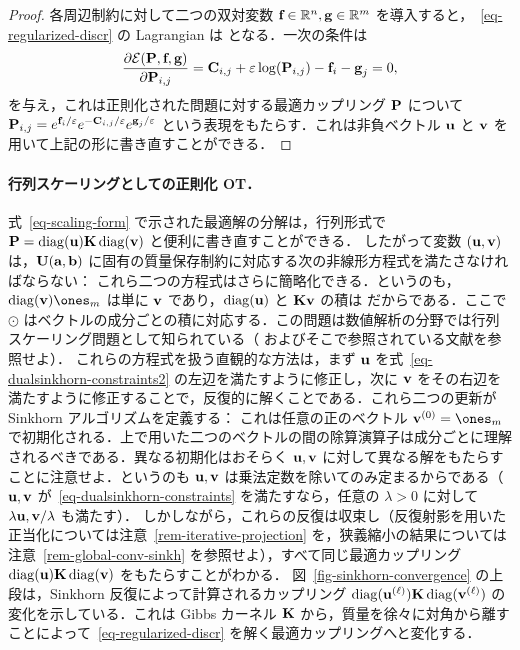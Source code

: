 \begin{proof}
各周辺制約に対して二つの双対変数 $\fD\in\RR^n,\gD\in\RR^m$ を導入すると，~\eqref{eq-regularized-discr} の Lagrangian は
となる．一次の条件は
$$
	\frac{\partial\Lag(\P,\fD,\gD)}{\partial \P_{i,j}}= \C_{i,j} + \varepsilon \log(\P_{i,j}) - \fD_i -\gD_j=0,
$$
を与え，これは正則化された問題に対する最適カップリング $\P$ について $\P_{i,j}=e^{\fD_i/\varepsilon}e^{-\C_{i,j}/\varepsilon}e^{\gD_j/\varepsilon}$ という表現をもたらす．これは非負ベクトル $\uD$ と $\vD$ を用いて上記の形に書き直すことができる．
\end{proof}

\paragraph{行列スケーリングとしての正則化 OT．}

式~\eqref{eq-scaling-form} で示された最適解の分解は，行列形式で $\P=\diag(\uD)\K\diag(\vD)$ と便利に書き直すことができる．
%
したがって変数 $(\uD,\vD)$ は，$\CouplingsD(\a,\b)$ に固有の質量保存制約に対応する次の非線形方程式を満たさなければならない：
これら二つの方程式はさらに簡略化できる．というのも，$\diag(\vD)\ones_m$ は単に $\vD$ であり，$\diag(\uD)$ と $\K \vD$ の積は
\eql{\label{eq-dualsinkhorn-constraints2}
	\uD \odot (\K \vD) = \a
	\qandq
	\vD \odot (\transp{\K}\uD) = \b,
}
だからである．ここで $\odot$ はベクトルの成分ごとの積に対応する．この問題は数値解析の分野では行列スケーリング問題として知られている（\citep{nemirovski1999complexity} およびそこで参照されている文献を参照せよ）．
%
これらの方程式を扱う直観的な方法は，まず $\uD$ を式~\eqref{eq-dualsinkhorn-constraints2} の左辺を満たすように修正し，次に $\vD$ をその右辺を満たすように修正することで，反復的に解くことである．これら二つの更新が Sinkhorn アルゴリズムを定義する：
\eql{\label{eq-sinkhorn}
	\itt{\uD} \eqdef \frac{\a}{\K \it{\vD}}
	\qandq
	\itt{\vD} \eqdef \frac{\b}{\transp{\K}\itt{\uD}},
}
これは任意の正のベクトル $\init{\vD} = \ones_m$ で初期化される．上で用いた二つのベクトルの間の除算演算子は成分ごとに理解されるべきである．異なる初期化はおそらく $\uD,\vD$ に対して異なる解をもたらすことに注意せよ．というのも $\uD,\vD$ は乗法定数を除いてのみ定まるからである（$\uD,\vD$ が~\eqref{eq-dualsinkhorn-constraints} を満たすなら，任意の $\lambda>0$ に対して $\lambda\uD,\vD/\lambda$ も満たす）．
%
しかしながら，これらの反復は収束し（反復射影を用いた正当化については注意~\ref{rem-iterative-projection} を，狭義縮小の結果については注意~\ref{rem-global-conv-sinkh} を参照せよ），すべて同じ最適カップリング $\diag(\uD)\K\diag(\vD)$ をもたらすことがわかる．
%
図~\ref{fig-sinkhorn-convergence} の上段は，Sinkhorn 反復によって計算されるカップリング $\diag(\it{\uD})\K\diag(\it{\vD})$ の変化を示している．これは Gibbs カーネル $\K$ から，質量を徐々に対角から離すことによって~\eqref{eq-regularized-discr} を解く最適カップリングへと変化する．

